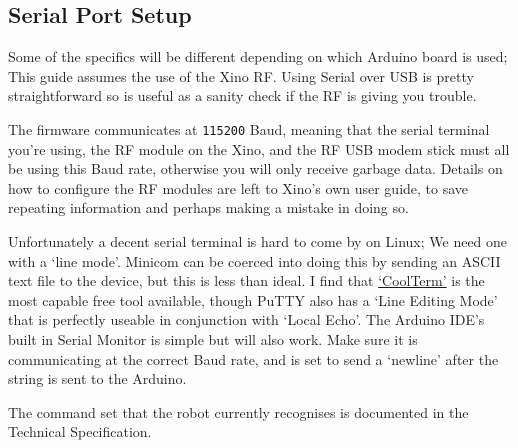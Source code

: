 \subsection{Serial Port Setup}

Some of the specifics will be different depending on which Arduino board is used; This guide assumes the use of the Xino RF. Using Serial over USB is pretty straightforward so is useful as a sanity check if the RF is giving you trouble.

The firmware communicates at \texttt{115200} Baud, meaning that the serial terminal you're using, the RF module on the Xino, and the RF USB modem stick must all be using this Baud rate, otherwise you will only receive garbage data. Details on how to configure the RF modules are left to Xino's own user guide, to save repeating information and perhaps making a mistake in doing so.

Unfortunately a decent serial terminal is hard to come by on Linux; We need one with a `line mode'. Minicom can be coerced into doing this by sending an ASCII text file to the device, but this is less than ideal. I find that \href{http://freeware.the-meiers.org/}{`CoolTerm'} is the most capable free tool available, though PuTTY also has a `Line Editing Mode' that is perfectly useable in conjunction with `Local Echo'. The Arduino IDE's built in Serial Monitor is simple but will also work. Make sure it is communicating at the correct Baud rate, and is set to send a `newline' after the string is sent to the Arduino.

The command set that the robot currently recognises is documented in the Technical Specification.
